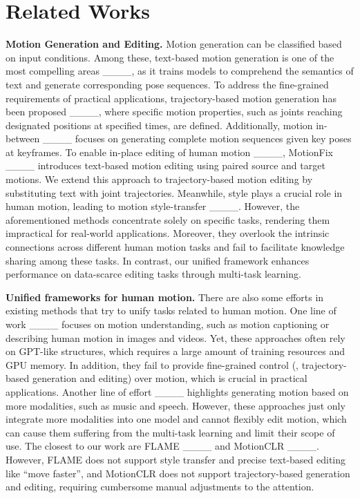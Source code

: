 \section{Related Works}
\textbf{Motion Generation and Editing.} Motion generation can be classified based on input conditions. Among these, text-based motion generation is one of the most compelling areas ____, as it trains models to comprehend the semantics of text and generate corresponding pose sequences. To address the fine-grained requirements of practical applications, trajectory-based motion generation has been proposed ____, where specific motion properties, such as joints reaching designated positions at specified times, are defined. Additionally, motion in-between ____ focuses on generating complete motion sequences given key poses at keyframes. To enable in-place editing of human motion ____, MotionFix ____ introduces text-based motion editing using paired source and target motions. We extend this approach to trajectory-based motion editing by substituting text with joint trajectories. Meanwhile, style plays a crucial role in human motion, leading to motion style-transfer ____. However, the aforementioned methods concentrate solely on specific tasks, rendering them impractical for real-world applications. Moreover, they overlook the intrinsic connections across different human motion tasks and fail to facilitate knowledge sharing among these tasks. In contrast, our unified framework enhances performance on data-scarce editing tasks through multi-task learning.

\noindent\textbf{Unified frameworks for human motion.} There are also some efforts in existing methods that try to unify tasks related to human motion. One line of work ____ focuses on motion understanding, such as motion captioning or describing human motion in images and videos. Yet, these approaches often rely on GPT-like structures, which requires a large amount of training resources and GPU memory. In addition, they fail to provide fine-grained control (\eg, trajectory-based generation and editing) over motion, which is crucial in practical applications. Another line of effort ____ highlights generating motion based on more modalities, such as music and speech. However, these approaches just only integrate more modalities into one model and cannot flexibly edit motion, which can cause them suffering from the multi-task learning and limit their scope of use. The closest to our work are FLAME ____ and MotionCLR ____.
However, FLAME does not support style transfer and precise text-based editing like ``move faster'', and MotionCLR does not support trajectory-based generation and editing, requiring cumbersome manual adjustments to the attention.

